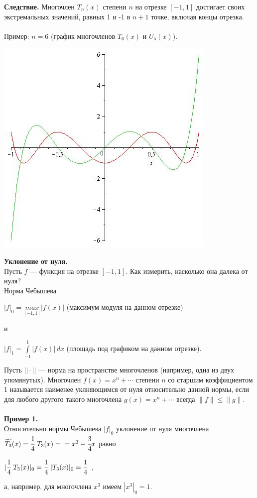 \documentclass[12pt]{article}
\theoremstyle{definition}
\numberwithin{equation}{section}
\begin{document}
\textbf{Следствие.}
Многочлен $T_n(x)$ степени $n$ на отрезке $[-1, 1]$ достигает своих экстремальных значений, равных 1 и -1 в $n+1$ точке, включая концы отрезка.\\ \\
Пример: $n=6$ (график многочленов $T_6(x)$ и $U_5(x)$).\begin{center}
\includegraphics[scale=0.5]{T6U5.jpg} \end{center}
\textbf{Уклонение от нуля.}\\
Пусть $f$ --- функция на отрезке $[-1, 1]$. Как измерить, насколько она далека от нуля?\\
Норма Чебышева \begin{center}$|f|_0=\underset{[-1, 1]}{max}|f(x)|$ (максимум модуля на данном отрезке)\end{center}
и \begin{center}$|f|_1=\int\limits_{-1}^1 |f(x)|\,dx$ (площадь под графиком на данном отрезке).\end{center}
Пусть $|| \cdot ||$ --- норма на пространстве многочленов (например, одна из двух упомянутых). Многочлен $f(x)=x^n+\cdots$ степени $n$ со старшим коэффициентом 1 называется наименее уклняющимся от нуля относительно данной нормы, если для любого другого такого многочлена $g(x)=x^n+\cdots$ всегда $\parallel f \parallel \leqslant \parallel g \parallel$.\\
\\
\textbf{Пример 1.}\\
Относительно нормы Чебышева $|f|_0$ уклонение от нуля многочлена $\widetilde{T_3}(x)=\cfrac{1}{4}~T_3(x)=\\=x^3-\cfrac{3}{4}x$ равно\begin{center} $|\cfrac{1}{4}~T_3(x)|_0=\cfrac{1}{4}~|T_3(x)|_0=\cfrac{1}{4}$~,\end{center} а, например, для многочлена $x^3$ имеем $|x^3|_0=1$.\\ \\
\end{document}
